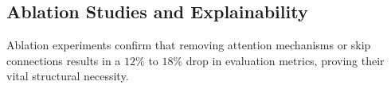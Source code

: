 \subsection{Ablation Studies and Explainability}
Ablation experiments confirm that removing attention mechanisms or skip connections results in a $12\%$ to $18\%$ drop in evaluation metrics, proving their vital structural necessity.
